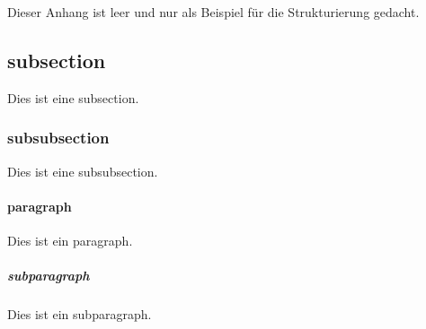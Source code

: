 
Dieser Anhang ist leer und nur als Beispiel für die Strukturierung
gedacht.


\subsection{subsection}

Dies ist eine subsection.

\subsubsection{subsubsection}

Dies ist eine subsubsection.
\paragraph{paragraph}
Dies ist ein paragraph.
\subparagraph{subparagraph}
Dies ist ein subparagraph.


